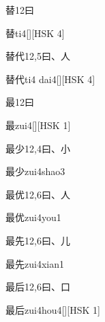 \begin{entry}{替}{12}{⽈}
  \begin{phonetics}{替}{ti4}[][HSK 4]
  \end{phonetics}
\end{entry}

\begin{entry}{替代}{12,5}{⽈、⼈}
  \begin{phonetics}{替代}{ti4 dai4}[][HSK 4]
  \end{phonetics}
\end{entry}

\begin{entry}{最}{12}{⽈}
  \begin{phonetics}{最}{zui4}[][HSK 1]
  \end{phonetics}
\end{entry}

\begin{entry}{最少}{12,4}{⽈、⼩}
  \begin{phonetics}{最少}{zui4shao3}
  \end{phonetics}
\end{entry}

\begin{entry}{最优}{12,6}{⽈、⼈}
  \begin{phonetics}{最优}{zui4you1}
  \end{phonetics}
\end{entry}

\begin{entry}{最先}{12,6}{⽈、⼉}
  \begin{phonetics}{最先}{zui4xian1}
  \end{phonetics}
\end{entry}

\begin{entry}{最后}{12,6}{⽈、⼝}
  \begin{phonetics}{最后}{zui4hou4}[][HSK 1]
  \end{phonetics}
\end{entry}

